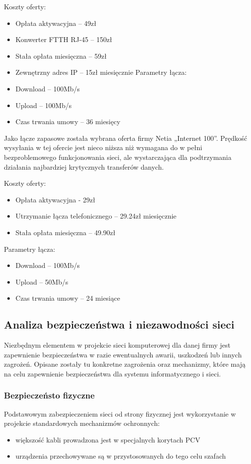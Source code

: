 \documentclass{article}
\begin{document}
Koszty oferty:
\begin{itemize}
	\item Opłata aktywacyjna – 49zł
\item	Konwerter FTTH \lt RJ-45 – 150zł
	\item	Stała opłata miesięczna – 59zł
	\item Zewnętrzny adres IP – 15zł miesięcznie
	Parametry łącza:
	\item	Download – 100Mb/s
	\item Upload – 100Mb/s
	\item Czas trwania umowy – 36 miesięcy
\end{itemize}


Jako łącze zapasowe została wybrana oferta firmy Netia „Internet 100”.  Prędkość wysyłania w tej ofercie jest nieco niższa niż wymagana do w pełni bezproblemowego funkcjonowania sieci, ale wystarczająca dla podtrzymania działania najbardziej krytycznych transferów danych. 

Koszty oferty:
\begin{itemize}
\item 	Opłata aktywacyjna - 29zł
\item 	Utrzymanie łącza telefonicznego – 29.24zł miesięcznie
\item 	Stała opłata miesięczna – 49.90zł
\end{itemize}


Parametry łącza:
\begin{itemize}
\item 	Download – 100Mb/s
\item 	Upload – 50Mb/s
\item 	Czas trwania umowy – 24 miesiące
\end{itemize}



\subsection{Analiza bezpieczeństwa i niezawodności sieci}
Niezbędnym elementem w projekcie sieci komputerowej dla danej firmy jest zapewnienie bezpieczeństwa w razie ewentualnych awarii, uszkodzeń lub innych zagrożeń. Opisane zostały tu konkretne zagrożenia oraz mechanizmy, które mają na celu zapewnienie bezpieczeństwa dla systemu informatycznego i sieci.

\subsubsection{Bezpieczeństo fizyczne}
Podstawowym zabezpieczeniem sieci od strony fizycznej jest wykorzystanie w projekcie standardowych mechanizmów
ochronnych:
\begin{itemize}
	\item większość kabli prowadzona jest w specjalnych korytach PCV
	\item urządzenia przechowywane są w przystosowanych do tego celu szafach
\end{itemize}
\end{document}
